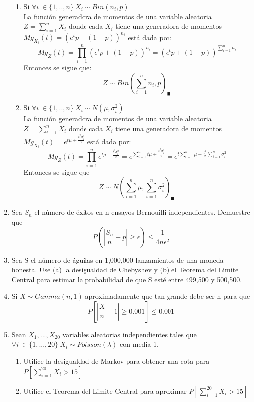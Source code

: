 \documentclass[11pt,a4paper]{report}
\begin{document}
\begin{enumerate}
{\begin{enumerate}
                \item{Si $\forall i \ \in \lbrace 1,..,n \rbrace \ X_{i} \sim Bin(n_{i},p)$ } \\
                La función generadora de momentos de una variable aleatoria $Z=\sum_{i=1}^{n}X_{i}$ donde cada $X_{i}$ tiene una generadora de momentos $Mg_{X_{i}}(t)=(e^t p+(1-p))^{n_{i}}$ está dada por:
                $$Mg_{Z}(t)=\prod_{i=1}^{n}(e^t p+(1-p))^{n_{i}}=(e^t p+(1-p))^{\sum_{i=1}^{n}n_{i}}$$
                Entonces se sigue que:
                $$Z\sim Bin(\sum_{i=1}^{n}n_{i},p)_{\blacksquare}$$
                \item{Si $\forall i \ \in \lbrace 1,..,n \rbrace \ X_{i} \sim N(\mu,\sigma_{i}^2)$ }\\
                La función generadora de momentos de una variable aleatoria $Z=\sum_{i=1}^{n}X_{i}$ donde cada $X_{i}$ tiene una generadora de momentos $Mg_{X_{i}}(t)=e^{t\mu +\frac{t^2 \sigma_{i} ^2}{2}}$ está dada por:
                $$Mg_{Z}(t)=\prod_{i=1}^{n} e^{t\mu +\frac{t^2 \sigma_{i} ^2}{2}}=e^{\sum_{i=1}^{n}t\mu + \frac{t^2 \sigma_{i} ^2}{2}}=e^{t\sum_{i=1}^{n}\mu+\frac{t^2}{2}\sum_{i=1}^{n}\sigma_{i} ^2}$$
                Entonces se sigue que 
                $$Z\sim N(\sum_{i=1}^{n}\mu,\sum_{i=1}^{n} \sigma_{i}^2)_{\blacksquare} $$
                
			\end{enumerate} 
		}

		\item{
		Sea $S_{n}$ el número de éxitos en n ensayos Bernouilli independientes. Demuestre que $$P(|\frac{S_{n}}{n}-p|\geq \epsilon)\leq \frac{1}{4n\epsilon^2}$$
			
		}

		\item{
		Sea S el número de águilas en 1,000,000 lanzamientos de una moneda honesta. Use (a) la desigualdad de Chebyshev y (b) el Teorema del Límite Central para estimar la probabilidad de que S esté entre 499,500 y 500,500.
		}

		\item{
			
          Si $X \sim Gamma(n,1)$ aproximadamente que tan grande debe ser n para que 
          $$P[|\frac{X}{n}-1|\geq 0.001]\leq 0.001$$
		}

		\item{
			Sean $X_{1},...,X_{20}$ variables aleatorias independientes tales que $\forall i \ \in \lbrace 1,...,20 \rbrace \ X_{i} \sim Poisson(\lambda) $ con media 1.\\
			\begin{enumerate}
			    \item{Utilice la desigualdad de Markov para obtener una cota para $P[\sum_{i=1}^{20}X_{i}>15]$} 
			    \item{Utilice el Teorema del Limite Central para aproximar $P[\sum_{i=1}^{20}X_{i}>15]$}
			\end{enumerate}
		}


\end{enumerate}
\end{document}
